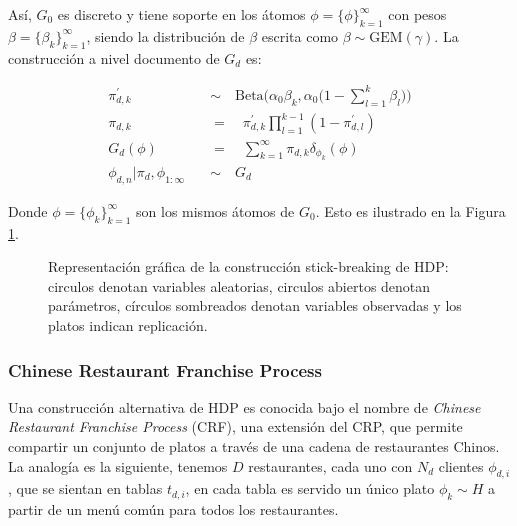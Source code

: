 \documentclass[letterpaper,12pt,oneside]{book} %
\begin{document}
Así, $G_{0}$ es discreto y tiene soporte en los átomos $\phi = \{\phi\}_{k=1}^{\infty}$ con pesos $\beta=\{\beta_{k}\}_{k=1}^{\infty}$, siendo la distribución de $\beta$ escrita como $\beta \sim \text{GEM}(\gamma)$. La construcción a nivel documento de $G_{d}$ es:

\begin{align}
    \pi_{d,k}^{'} \quad &\sim \quad \text{Beta}\big(\alpha_{0}\beta_{k}, \alpha_{0}\big(1-\sum_{l=1}^{k}\beta_{l}\big)\big)\\
    \pi_{d,k} \quad &= \quad \pi_{d,k}^{'}\prod_{l=1}^{k-1}(1-\pi_{d,l}^{'})\\
    G_{d}(\phi) \quad &= \quad\sum_{k=1}^{\infty}\pi_{d,k}\delta_{\phi_{k}}(\phi)\\
    \phi_{d,n}|\pi_{d}, \phi_{1:\infty} \quad &\sim \quad G_{d}
\end{align}

Donde $\phi = \{\phi_{k}\}_{k=1}^{\infty}$ son los mismos átomos de $G_{0}$. Esto es ilustrado en la Figura \ref{img:hdp_sbc}.

\begin{figure}
  \centering
\caption{Representación gráfica de la construcción stick-breaking de HDP: circulos denotan variables aleatorias, circulos abiertos denotan parámetros, círculos sombreados denotan variables observadas y los platos indican replicación.}
\label{img:hdp_sbc}
\end{figure}

\subsubsection{Chinese Restaurant Franchise Process}
Una construcción alternativa de HDP es conocida bajo el nombre de \textit{Chinese Restaurant Franchise Process} (CRF), una extensión del CRP, que permite compartir un conjunto de platos a través de una cadena de restaurantes Chinos. La analogía es la siguiente, tenemos $D$ restaurantes, cada uno con $N_{d}$ clientes $\phi_{d,i}$, que se sientan en tablas $t_{d,i}$, en cada tabla es servido un único plato $\phi_{k}\sim H$ a partir de un menú común para todos los restaurantes. \\
\end{document}
